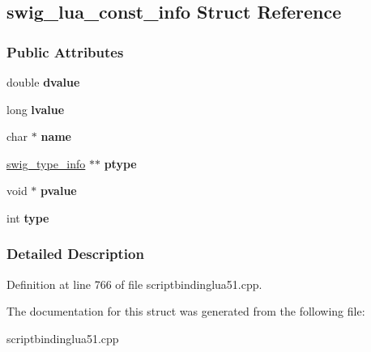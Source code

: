 \hypertarget{structswig__lua__const__info}{
\subsection{swig\_\-lua\_\-const\_\-info Struct Reference}
\label{structswig__lua__const__info}
}
\subsubsection*{Public Attributes}
\begin{DoxyCompactItemize}
\item 
\hypertarget{structswig__lua__const__info_ac50e848b2a6a628fa1eeb4924f608cee}{
double {\bfseries dvalue}}
\label{structswig__lua__const__info_ac50e848b2a6a628fa1eeb4924f608cee}

\item 
\hypertarget{structswig__lua__const__info_a0f4d6393367808867778882594520a44}{
long {\bfseries lvalue}}
\label{structswig__lua__const__info_a0f4d6393367808867778882594520a44}

\item 
\hypertarget{structswig__lua__const__info_aeab9027ebc600cf479ee0f977fd748b6}{
char $\ast$ {\bfseries name}}
\label{structswig__lua__const__info_aeab9027ebc600cf479ee0f977fd748b6}

\item 
\hypertarget{structswig__lua__const__info_a0557056988d98840029075f204d2bf59}{
\hyperlink{structswig__type__info}{swig\_\-type\_\-info} $\ast$$\ast$ {\bfseries ptype}}
\label{structswig__lua__const__info_a0557056988d98840029075f204d2bf59}

\item 
\hypertarget{structswig__lua__const__info_a54637f2603b1179d4996c06e82e3f23a}{
void $\ast$ {\bfseries pvalue}}
\label{structswig__lua__const__info_a54637f2603b1179d4996c06e82e3f23a}

\item 
\hypertarget{structswig__lua__const__info_a1c9ffb014aea4d37c1b73e0a446c9be1}{
int {\bfseries type}}
\label{structswig__lua__const__info_a1c9ffb014aea4d37c1b73e0a446c9be1}

\end{DoxyCompactItemize}


\subsubsection{Detailed Description}


Definition at line 766 of file scriptbindinglua51.cpp.



The documentation for this struct was generated from the following file:\begin{DoxyCompactItemize}
\item 
scriptbindinglua51.cpp\end{DoxyCompactItemize}
